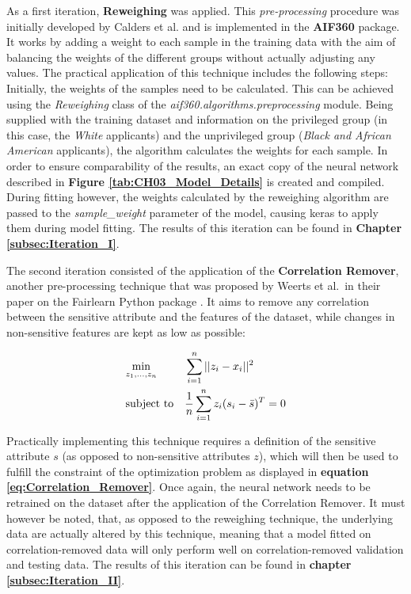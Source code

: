 As a first iteration, \textbf{Reweighing} was applied. This \textit{pre-processing} procedure was initially developed by Calders et al. \parencite{Calders2009} and is implemented in the \textbf{AIF360} package. It works by adding a weight to each sample in the training data with the aim of balancing the weights of the different groups without actually adjusting any values.
The practical application of this technique includes the following steps: Initially, the weights of the samples need to be calculated. This can be achieved using the \textit{Reweighing} class of the \textit{aif360.algorithms.preprocessing} module. Being supplied with the training dataset and information on the privileged group (in this case, the \textit{White} applicants) and the unprivileged group (\textit{Black and African American} applicants), the algorithm calculates the weights for each sample. 
In order to ensure comparability of the results, an exact copy of the neural network described in \textbf{Figure \ref{tab:CH03_Model_Details}} is created and compiled. During fitting however, the weights calculated by the reweighing algorithm are passed to the \textit{sample\_weight} parameter of the model, causing keras to apply them during model fitting. The results of this iteration can be found in \textbf{Chapter \ref{subsec:Iteration_I}}.

The second iteration consisted of the application of the \textbf{Correlation Remover}, another pre-processing technique that was proposed by Weerts et al.\ in their paper on the Fairlearn Python package \parencite{Weerts2023}. It aims to remove any correlation between the sensitive attribute and the features of the dataset, while changes in non-sensitive features are kept as low as possible:

\begin{equation}
    \begin{aligned}
        & \underset{z_1, \ldots, z_n}{\text{min}}
        & & \sum_{i=1}^n ||z_i - x_i||^2 \\
        & \text{subject to}
        & & \frac{1}{n} \sum_{i=1}^n z_i (s_i - \bar{s})^T = 0
        \end{aligned}
    \label{eq:Correlation_Remover}
    \addcontentsline{frm}{formulas}{\protect\numberline{\theequation}\hspace{1em}Correlation Remover}
\end{equation}

Practically implementing this technique requires a definition of the sensitive attribute $s$ (as opposed to non-sensitive attributes $z$), which will then be used to fulfill the constraint of the optimization problem as displayed in \textbf{equation \ref{eq:Correlation_Remover}}. 
Once again, the neural network needs to be retrained on the dataset after the application of the Correlation Remover. It must however be noted, that, as opposed to the reweighing technique, the underlying data are actually altered by this technique, meaning that a model fitted on correlation-removed data will only perform well on correlation-removed validation and testing data. The results of this iteration can be found in \textbf{chapter \ref{subsec:Iteration_II}}.

